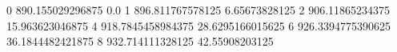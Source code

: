 0 890.155029296875 0.0
1 896.811767578125 6.65673828125
2 906.11865234375 15.963623046875
4 918.7845458984375 28.6295166015625
6 926.3394775390625 36.1844482421875
8 932.714111328125 42.55908203125

